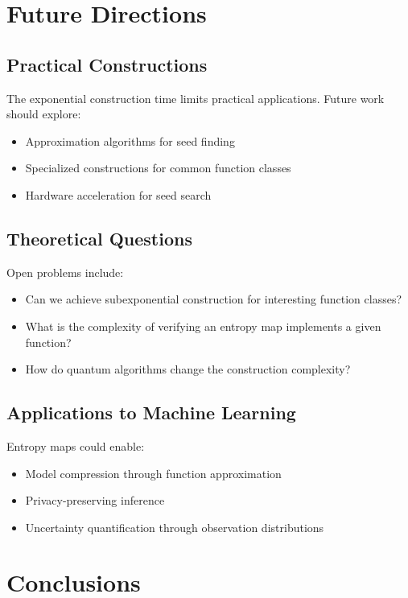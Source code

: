 \documentclass[11pt,final,hidelinks]{article}
\begin{document}
\section{Future Directions}

\subsection{Practical Constructions}

The exponential construction time limits practical applications. Future work should explore:
\begin{itemize}
    \item Approximation algorithms for seed finding
    \item Specialized constructions for common function classes
    \item Hardware acceleration for seed search
\end{itemize}

\subsection{Theoretical Questions}

Open problems include:
\begin{itemize}
    \item Can we achieve subexponential construction for interesting function classes?
    \item What is the complexity of verifying an entropy map implements a given function?
    \item How do quantum algorithms change the construction complexity?
\end{itemize}

\subsection{Applications to Machine Learning}

Entropy maps could enable:
\begin{itemize}
    \item Model compression through function approximation
    \item Privacy-preserving inference
    \item Uncertainty quantification through observation distributions
\end{itemize}

\section{Conclusions}
\end{document}
